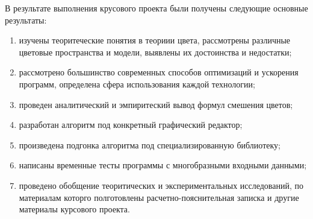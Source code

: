 \Conclusion %

В результате выполнения крусового проекта были получены следующие основные результаты:
\begin{enumerate}
	\item изучены теоритеческие понятия в теориии цвета, рассмотрены различные цветовые пространства и модели, выявлены их достоинства и недостатки;
	\item рассмотрено большинство современных способов оптимизаций и ускорения программ, определена сфера использования каждой технологии;
	\item проведен аналитический и эмпиритеский вывод формул смешения цветов;
	\item разработан алгоритм под конкретный графический редактор;
	\item произведена подгонка алгоритма под специализированную библиотеку;
	\item написаны временные тесты программы с многобразными входными данными;
	\item проведено обобщение теоритических и экспериментальных исследований, по материалам которго полготовлены расчетно-пояснительная записка и другие материалы курсового проекта.
\end{enumerate}
